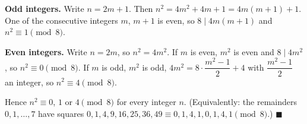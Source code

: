 \textbf{Odd integers.} Write $n=2m+1$. Then $n^2=4m^2+4m+1=4m(m+1)+1$. One of the consecutive integers $m$, $m+1$ is even, so $8\mid4m(m+1)$ and $n^2\equiv1\pmod8$.

\textbf{Even integers.} Write $n=2m$, so $n^2=4m^2$. If $m$ is even, $m^2$ is even and $8\mid4m^2$, so $n^2\equiv0\pmod8$. If $m$ is odd, $m^2$ is odd, $4m^2=8\cdot\dfrac{m^2-1}{2}+4$ with $\dfrac{m^2-1}{2}$ an integer, so $n^2\equiv4\pmod8$.

Hence $n^2\equiv0$, $1$ or $4\pmod8$ for every integer $n$. (Equivalently: the remainders $0,1,\dots,7$ have squares $0,1,4,9,16,25,36,49\equiv0,1,4,1,0,1,4,1\pmod8$.) $\blacksquare$
